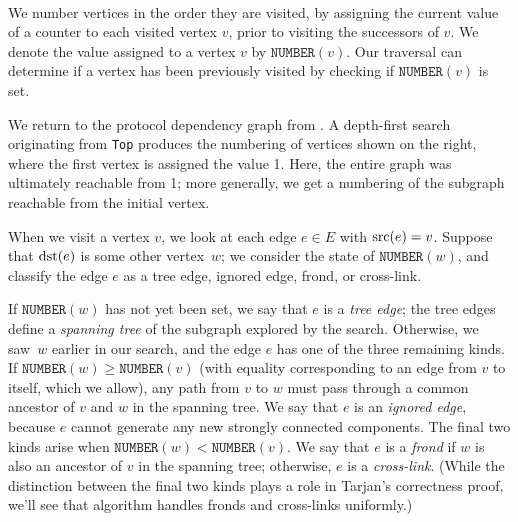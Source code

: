 \documentclass[../generics]{subfiles}
\begin{document}
\newcommand{\Number}[1]{\texttt{NUMBER}(#1)}
\newcommand{\Lowlink}[1]{\texttt{LOWLINK}(#1)}
\newcommand{\OnStack}[1]{\texttt{ONSTACK}(#1)}

\begin{wrapfigure}[11]{r}{2.7cm}
\,
\end{wrapfigure}

We number vertices in the order they are visited, by assigning the current value of a counter to each visited vertex $v$, prior to visiting the successors of $v$. We denote the value assigned to a vertex $v$ by $\Number{v}$. Our traversal can determine if a vertex has been previously visited by checking if $\Number{v}$ is set.

We return to the protocol dependency graph from . A depth-first search originating from \texttt{Top} produces the numbering of vertices shown on the right, where the first vertex is assigned the value 1. Here, the entire graph was ultimately reachable from 1; more generally, we get a numbering of the subgraph reachable from the initial vertex.

When we visit a vertex $v$, we look at each edge $e\in E$ with $\operatorname{src}(e)=v$. Suppose that $\operatorname{dst}(e)$ is some other vertex~$w$; we consider the state of $\Number{w}$, and classify the edge $e$ as a tree edge, ignored edge, frond, or cross-link.

If $\Number{w}$ has not yet been set, we say that $e$ is a \emph{tree edge}; the tree edges define a \emph{spanning tree} of the subgraph explored by the search. Otherwise, we saw~$w$ earlier in our search, and the edge $e$ has one of the three remaining kinds. If $\Number{w}\geq\Number{v}$ (with equality corresponding to an edge from $v$ to itself, which we allow), any path from $v$ to $w$ must pass through a common ancestor of $v$ and $w$ in the spanning tree. We say that $e$ is an \emph{ignored edge}, because $e$ cannot generate any new strongly connected components. The final two kinds arise when $\Number{w}<\Number{v}$. We say that $e$ is a \emph{frond} if $w$ is also an ancestor of $v$ in the spanning tree; otherwise, $e$ is a \emph{cross-link}. (While the distinction between the final two kinds plays a role in Tarjan's correctness proof, we'll see that algorithm handles fronds and cross-links uniformly.)
\end{document}

